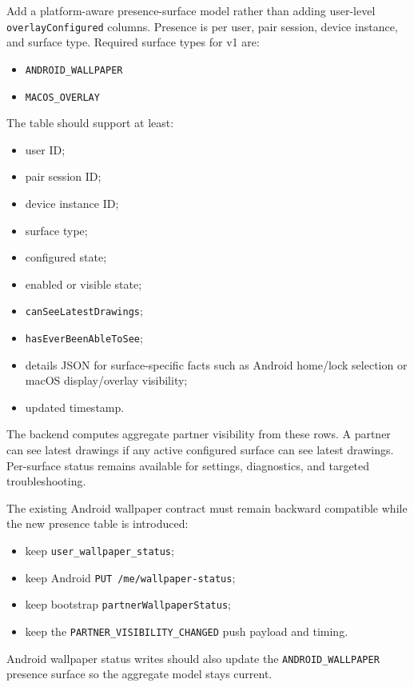 \documentclass[11pt]{article}
\begin{document}
Add a platform-aware presence-surface model rather than adding user-level \texttt{overlayConfigured} columns. Presence is per user, pair session, device instance, and surface type. Required surface types for v1 are:
\begin{itemize}
  \item \texttt{ANDROID\_WALLPAPER}
  \item \texttt{MACOS\_OVERLAY}
\end{itemize}

The table should support at least:
\begin{itemize}
  \item user ID;
  \item pair session ID;
  \item device instance ID;
  \item surface type;
  \item configured state;
  \item enabled or visible state;
  \item \texttt{canSeeLatestDrawings};
  \item \texttt{hasEverBeenAbleToSee};
  \item details JSON for surface-specific facts such as Android home/lock selection or macOS display/overlay visibility;
  \item updated timestamp.
\end{itemize}

The backend computes aggregate partner visibility from these rows. A partner can see latest drawings if any active configured surface can see latest drawings. Per-surface status remains available for settings, diagnostics, and targeted troubleshooting.

The existing Android wallpaper contract must remain backward compatible while the new presence table is introduced:
\begin{itemize}
  \item keep {\footnotesize\texttt{user\_wallpaper\_status}};
  \item keep Android {\footnotesize\texttt{PUT /me/wallpaper-status}};
  \item keep bootstrap {\footnotesize\texttt{partnerWallpaperStatus}};
  \item keep the {\footnotesize\texttt{PARTNER\_VISIBILITY\_CHANGED}} push payload and timing.
\end{itemize}

Android wallpaper status writes should also update the {\footnotesize\texttt{ANDROID\_WALLPAPER}} presence surface so the aggregate model stays current.
\end{document}
